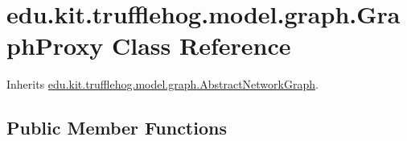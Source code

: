 \hypertarget{classedu_1_1kit_1_1trufflehog_1_1model_1_1graph_1_1_graph_proxy}{}\section{edu.\+kit.\+trufflehog.\+model.\+graph.\+Graph\+Proxy Class Reference}
\label{classedu_1_1kit_1_1trufflehog_1_1model_1_1graph_1_1_graph_proxy}


Inherits \hyperlink{classedu_1_1kit_1_1trufflehog_1_1model_1_1graph_1_1_abstract_network_graph}{edu.\+kit.\+trufflehog.\+model.\+graph.\+Abstract\+Network\+Graph}.

\subsection*{Public Member Functions}
